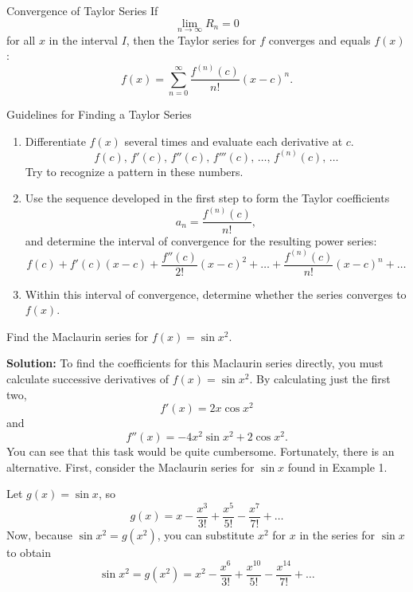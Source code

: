 \documentclass[12pt]{article}
\theoremstyle{beautifulthm}
\begin{document}
\begin{mytheorem}{ Convergence of Taylor Series}{}
    If 
\[
\lim_{n \to \infty} R_n = 0
\]
for all $x$ in the interval $I$, then the Taylor series for $f$ converges and equals $f(x)$:
\[
f(x) = \sum_{n=0}^\infty \frac{f^{(n)}(c)}{n!}(x - c)^n.
\]
\end{mytheorem}


\begin{Note}{Guidelines for Finding a Taylor Series}{}
    \begin{enumerate}
    \item Differentiate $f(x)$ several times and evaluate each derivative at $c$.
    \[
    f(c), \, f'(c), \, f''(c), \, f'''(c), \, \dots, \, f^{(n)}(c), \, \dots
    \]
    Try to recognize a pattern in these numbers.
    \item Use the sequence developed in the first step to form the Taylor coefficients 
    \[
    a_n = \frac{f^{(n)}(c)}{n!},
    \]
    and determine the interval of convergence for the resulting power series:
    \[
    f(c) + f'(c)(x - c) + \frac{f''(c)}{2!}(x - c)^2 + \dots + \frac{f^{(n)}(c)}{n!}(x - c)^n + \dots
    \]
    \item Within this interval of convergence, determine whether the series converges to $f(x)$.
\end{enumerate}
\end{Note}


\begin{tcolorbox}[colback=examplebg, colframe=red!75!black, title=\textbf{EXAMPLE 2: Maclaurin Series for a Composite Function}, fonttitle=\bfseries, sharp corners]
Find the Maclaurin series for $f(x) = \sin x^2$.


\tcblower
\textbf{Solution:} 
To find the coefficients for this Maclaurin series directly, you must calculate successive derivatives of $f(x) = \sin x^2$. By calculating just the first two,
\[
f'(x) = 2x \cos x^2
\]
and
\[
f''(x) = -4x^2 \sin x^2 + 2 \cos x^2.
\]
You can see that this task would be quite cumbersome. Fortunately, there is an alternative. First, consider the Maclaurin series for $\sin x$ found in Example 1.

Let $g(x) = \sin x$, so
\[
g(x) = x - \frac{x^3}{3!} + \frac{x^5}{5!} - \frac{x^7}{7!} + \dots
\]
Now, because $\sin x^2 = g(x^2)$, you can substitute $x^2$ for $x$ in the series for $\sin x$ to obtain
\[
\sin x^2 = g(x^2) = x^2 - \frac{x^6}{3!} + \frac{x^{10}}{5!} - \frac{x^{14}}{7!} + \dots
\]
\end{tcolorbox}
\end{document}
